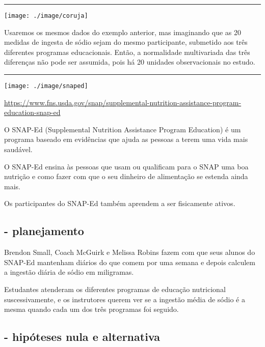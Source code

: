 \documentclass[]{article}
\begin{document}
\begin{center}\rule{0.5\linewidth}{\linethickness}\end{center}

\begin{flushleft}\texttt{[image: ./image/coruja]} \end{flushleft}

Usaremos os mesmos dados do exemplo anterior, mas imaginando que as 20
medidas de ingesta de sódio sejam do mesmo participante, submetido aos
três diferentes programas educacionais. Então, a normalidade
multivariada das três diferenças não pode ser assumida, pois há 20
unidades observacionais no estudo.

\begin{center}\rule{0.5\linewidth}{\linethickness}\end{center}

\begin{flushleft}\texttt{[image: ./image/snaped]} \end{flushleft}

\url{https://www.fns.usda.gov/snap/supplemental-nutrition-assistance-program-education-snap-ed}

O SNAP-Ed (Supplemental Nutrition Assistance Program Education) é um
programa baseado em evidências que ajuda as pessoas a terem uma vida
mais saudável.

O SNAP-Ed ensina às pessoas que usam ou qualificam para o SNAP uma boa
nutrição e como fazer com que o seu dinheiro de alimentação se estenda
ainda mais.

Os participantes do SNAP-Ed também aprendem a ser fisicamente ativos.

\subsection{- planejamento}\label{planejamento-1}

Brendon Small, Coach McGuirk e Melissa Robins fazem com que seus alunos
do SNAP-Ed mantenham diários do que comem por uma semana e depois
calculem a ingestão diária de sódio em miligramas.

Estudantes atenderam os diferentes programas de educação nutricional
suscessivamente, e os instrutores querem ver se a ingestão média de
sódio é a mesma quando cada um dos três programas foi seguido.

\subsection{- hipóteses nula e
alternativa}\label{hipoteses-nula-e-alternativa-1}
\end{document}
